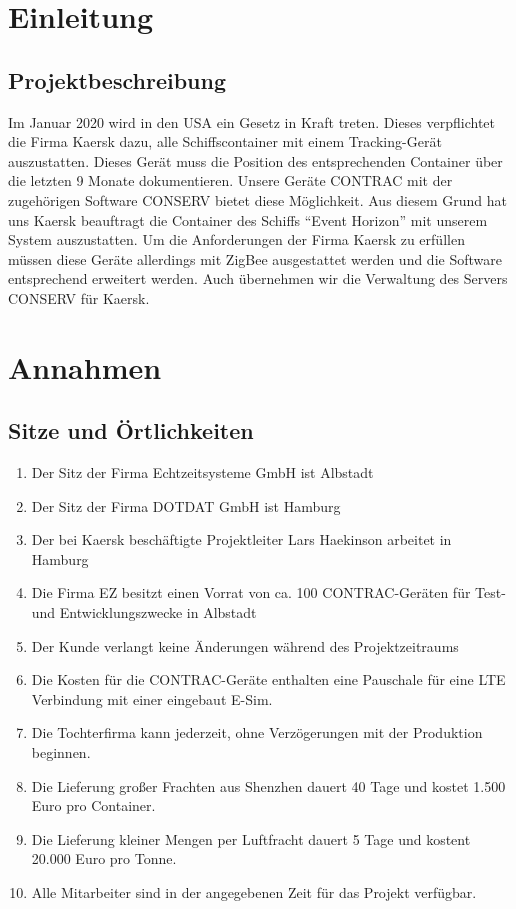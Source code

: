 

\section{Einleitung}
\subsection{Projektbeschreibung}
Im Januar 2020 wird in den USA ein Gesetz in Kraft treten. Dieses verpflichtet die Firma Kaersk dazu, alle Schiffscontainer mit einem Tracking-Gerät auszustatten. Dieses Gerät muss die Position des entsprechenden Container über die letzten 9 Monate dokumentieren. Unsere Geräte CONTRAC mit der zugehörigen Software CONSERV bietet diese Möglichkeit. Aus diesem Grund hat uns Kaersk beauftragt die Container des Schiffs "`Event Horizon"' mit unserem System auszustatten. Um die Anforderungen der Firma Kaersk zu erfüllen müssen diese Geräte allerdings mit ZigBee ausgestattet werden und die Software entsprechend erweitert werden. Auch übernehmen wir die Verwaltung des Servers CONSERV für Kaersk.
\section{Annahmen}
\subsection{Sitze und Örtlichkeiten}
\begin{enumerate}
    \item Der Sitz der Firma Echtzeitsysteme GmbH ist Albstadt
    \item Der Sitz der Firma DOTDAT GmbH ist Hamburg
    \item Der bei Kaersk beschäftigte Projektleiter Lars Haekinson arbeitet in Hamburg
    \item Die Firma EZ besitzt einen Vorrat von ca. 100 CONTRAC-Geräten für Test- und Entwicklungszwecke in Albstadt
    \item Der Kunde verlangt keine Änderungen während des Projektzeitraums
   
    \item Die Kosten für die CONTRAC-Geräte enthalten eine Pauschale für eine LTE Verbindung mit einer eingebaut E-Sim.
	\item Die Tochterfirma kann jederzeit, ohne Verzögerungen mit der Produktion beginnen.
    \item Die Lieferung großer Frachten aus Shenzhen dauert 40 Tage und kostet 1.500 Euro pro Container.
    \item Die Lieferung kleiner Mengen per Luftfracht dauert 5 Tage und kostent 20.000 Euro pro Tonne.
    \item Alle Mitarbeiter sind in der angegebenen Zeit für das Projekt verfügbar.
\end{enumerate}

